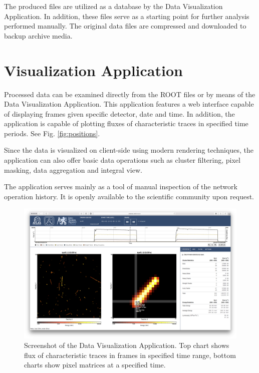 \documentclass[conference]{IEEEtran}
\begin{document}
The produced files are utilized as a database by the Data Visualization Application. In addition, these files serve as a starting point for further analysis performed manually. The original data files are compressed and downloaded to backup archive media.

\section{\label{sec:dal}Visualization Application}
Processed data can be examined directly from the ROOT files or by means of the Data Visualization Application. \cite{Manek2016} This application features a web interface capable of displaying frames given specific detector, date and time. In addition, the application is capable of plotting fluxes of characteristic traces in specified time periods. See Fig. \ref{fig:positions}.

Since the data is visualized on client-side using modern rendering techniques, the application can also offer basic data operations such as cluster filtering, pixel masking, data aggregation and integral view.

The application serves mainly as a tool of manual inspection of the network operation history. It is openly available to the scientific community upon request.

\begin{figure}[tbp]
	\centering
        \includegraphics[clip, width=\textwidth, angle = 0 ]{Plots/screen-tpx01-crosshair-zoomed.png}
	  \caption {Screenshot of the Data Visualization Application. \cite{Manek2016} Top chart shows flux of characteristic traces in frames in specified time range, bottom charts show pixel matrices at a specified time.}
    \label{fig:visualizer}
\end{figure}
\end{document}
